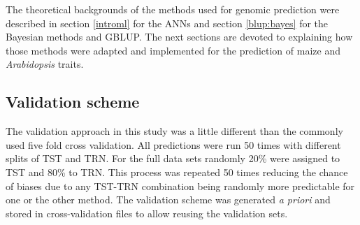 The theoretical backgrounds of the methods used for genomic prediction were described in
section \ref{introml} for the ANNs and section \ref{blup:bayes} for the Bayesian methods
and GBLUP. The next sections are devoted to explaining how those methods were adapted and
implemented for the prediction of maize and \textit{Arabidopsis} traits.

\subsection{Validation scheme} \label{cv}

The validation approach in this study was a little different than the commonly used five
fold cross validation. All predictions were run 50 times with different splits of TST and
TRN. For the full data sets randomly 20\% were assigned to TST and 80\% to TRN. This
process was repeated 50 times reducing the chance of biases due to any TST-TRN combination
being randomly more predictable for one or the other method. The validation scheme was
generated \textit{a priori} and stored in cross-validation files to allow reusing the
validation sets.

